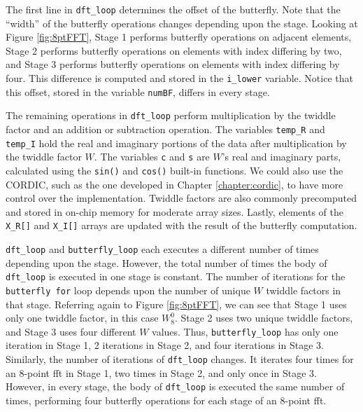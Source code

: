 The first line in \lstinline|dft_loop| determines the offset of the butterfly. Note that the ``width'' of the butterfly operations changes depending upon the stage. Looking at Figure \ref{fig:8ptFFT}, Stage 1 performs butterfly operations on adjacent elements, Stage 2 performs butterfly operations on elements with index differing by two, and Stage 3 performs butterfly operations on elements with index differing by four. This difference is computed and stored in the \lstinline|i_lower| variable. Notice that this offset, stored in the variable \lstinline|numBF|, differs in every stage. 

The remaining operations in \lstinline|dft_loop| perform multiplication by the twiddle factor and an addition or subtraction operation. The variables \lstinline|temp_R| and \lstinline|temp_I| hold the real and imaginary portions of the data after multiplication by the twiddle factor $W$. The variables \lstinline|c| and \lstinline|s| are $ W$'s real and imaginary parts, calculated using the \lstinline|sin()| and \lstinline|cos()| built-in functions. We could also use the CORDIC, such as the one developed in Chapter \ref{chapter:cordic}, to have more control over the implementation. Twiddle factors are also commonly precomputed and stored in on-chip memory for moderate array sizes.  Lastly, elements of the \lstinline|X_R[]| and \lstinline|X_I[]| arrays are updated with the result of the butterfly computation.

\lstinline|dft_loop| and \lstinline|butterfly_loop| each executes a different number of times depending upon the stage. However, the total number of times the body of \lstinline|dft_loop| is executed in one stage is constant. The number of iterations for the \lstinline|butterfly for| loop depends upon the number of unique $W$ twiddle factors in that stage. Referring again to Figure \ref{fig:8ptFFT}, we can see that Stage 1 uses only one twiddle factor, in this case $W_8^0$. Stage 2 uses two unique twiddle factors, and Stage 3 uses four different $W$ values. Thus, \lstinline|butterfly_loop| has only one iteration in Stage 1, 2 iterations in Stage 2, and four iterations in Stage 3. Similarly, the number of iterations of \lstinline|dft_loop| changes. It iterates four times for an 8-point \gls{fft} in Stage 1, two times in Stage 2, and only once in Stage 3. However, in every stage, the body of \lstinline|dft_loop| is executed the same number of times, performing four butterfly operations for each stage of an 8-point \gls{fft}. 

